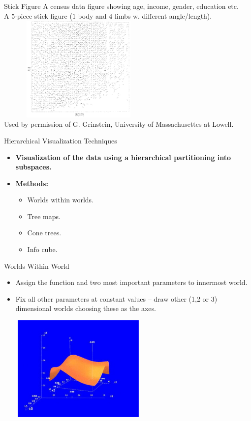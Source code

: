 \begin{frame}{Stick Figure}
  A census data figure showing age, income, gender, education etc. \\
  A $5$-piece stick figure ($1$ body and $4$ limbs w. different angle/length).\\[0.1cm]
  \centering
  \includegraphics[width=8cm, height=5.2cm]{img/stick_figure.png}\\
  \tiny{Used by permission of G. Grinstein, University of Massachusettes at Lowell.}
\end{frame}

\begin{frame}{Hierarchical Visualization Techniques}
  \centering
  \begin{itemize}
  \item \textbf{Visualization of the data using a hierarchical partitioning into subspaces.}
  \item \textbf{Methods:}
    \begin{itemize}
    \item Worlds within worlds.
    \item Tree maps.
    \item Cone trees.
    \item Info cube.
    \end{itemize}
  \end{itemize}
\end{frame}

\begin{frame}{Worlds Within World}
  \begin{itemize}
  \item Assign the function and two most important parameters to innermost world.
  \item Fix all other parameters at constant values -- draw other (1,2 or 3) dimensional worlds choosing these as the axes.
  \end{itemize}
  \centering
  \includegraphics[width=8cm,height=5.2cm]{img/www.jpg}
\end{frame}

